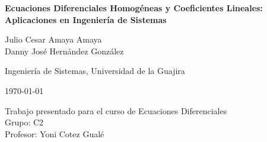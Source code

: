 \documentclass[12pt]{article}
\begin{document}
\begin{titlepage}
    \centering
    \vspace*{2cm}
    
    {\LARGE \textbf{Ecuaciones Diferenciales Homogéneas y Coeficientes Lineales: Aplicaciones en Ingeniería de Sistemas}\par}
    
    \vspace{3cm}
    
    {\large Julio Cesar Amaya Amaya \\ Danny José Hernández González\par}
    \vspace{0.5cm}
    {\large Ingeniería de Sistemas, Universidad de la Guajira\par}
    
    \vspace{2cm}
    
    {\large \today\par}
    
    \vspace{3cm}
    
    \begin{flushleft}
        Trabajo presentado para el curso de Ecuaciones Diferenciales\\
        Grupo: C2\\
        Profesor: Yoni Cotez Gualé
    \end{flushleft}
    
    \vfill
\end{titlepage}

\thispagestyle{empty}
\newpage
\end{document}
